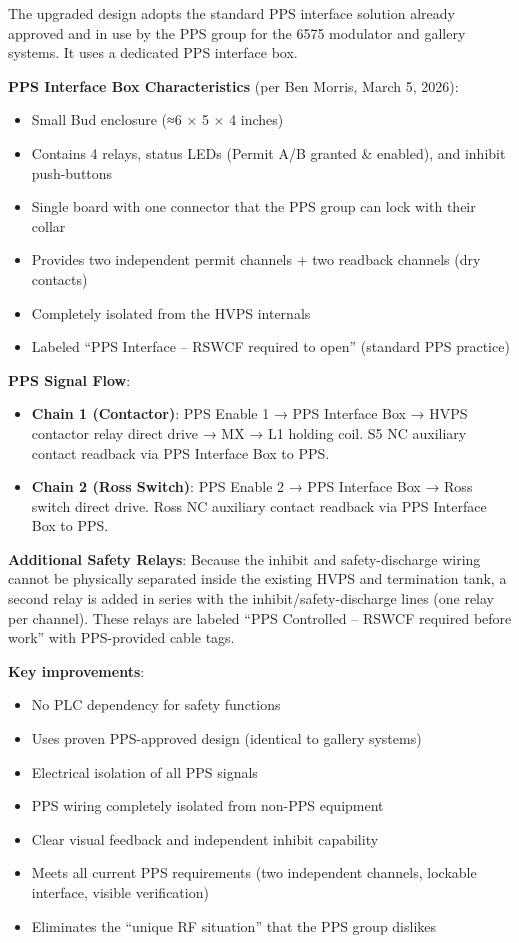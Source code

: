 The upgraded design adopts the standard PPS interface solution already approved and in use by the PPS group for the 6575 modulator and gallery systems. It uses a dedicated PPS interface box.

\textbf{PPS Interface Box Characteristics} (per Ben Morris, March 5, 2026):

\begin{itemize}
\tightlist
\item
  Small Bud enclosure (≈6 × 5 × 4 inches)
\item
  Contains 4 relays, status LEDs (Permit A/B granted \& enabled), and inhibit push-buttons
\item
  Single board with one connector that the PPS group can lock with their collar
\item
  Provides two independent permit channels + two readback channels (dry contacts)
\item
  Completely isolated from the HVPS internals
\item
  Labeled ``PPS Interface -- RSWCF required to open'' (standard PPS practice)
\end{itemize}

\textbf{PPS Signal Flow}:

\begin{itemize}
\tightlist
\item
  \textbf{Chain 1 (Contactor)}: PPS Enable 1 → PPS Interface Box → HVPS contactor relay direct drive → MX → L1 holding coil. S5 NC auxiliary contact readback via PPS Interface Box to PPS.
\item
  \textbf{Chain 2 (Ross Switch)}: PPS Enable 2 → PPS Interface Box → Ross switch direct drive. Ross NC auxiliary contact readback via PPS Interface Box to PPS.
\end{itemize}

\textbf{Additional Safety Relays}: Because the inhibit and safety-discharge wiring cannot be physically separated inside the existing HVPS and termination tank, a second relay is added in series with the inhibit/safety-discharge lines (one relay per channel). These relays are labeled ``PPS Controlled -- RSWCF required before work'' with PPS-provided cable tags.

\textbf{Key improvements}:

\begin{itemize}
\tightlist
\item
  No PLC dependency for safety functions
\item
  Uses proven PPS-approved design (identical to gallery systems)
\item
  Electrical isolation of all PPS signals
\item
  PPS wiring completely isolated from non-PPS equipment
\item
  Clear visual feedback and independent inhibit capability
\item
  Meets all current PPS requirements (two independent channels, lockable interface, visible verification)
\item
  Eliminates the ``unique RF situation'' that the PPS group dislikes
\end{itemize}

